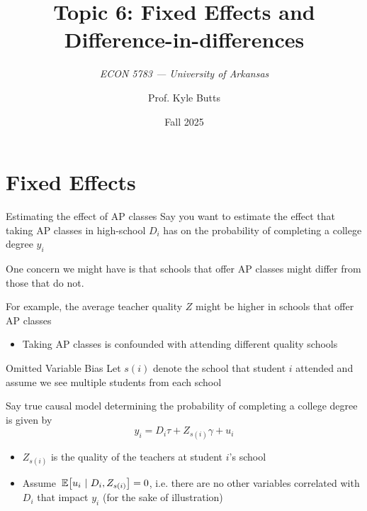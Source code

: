 \documentclass[aspectratio=169,t,11pt,table]{beamer}
\title{Topic 6: Fixed Effects and Difference-in-differences}
\subtitle{\it  ECON 5783 — University of Arkansas}
\date{Fall 2025}
\author{Prof. Kyle Butts}
\begin{document}
\begin{frame}
\maketitle

\end{frame}

\section{Fixed Effects}

\begin{frame}{Estimating the effect of AP classes}
  Say you want to estimate the effect that taking AP classes in high-school $D_i$ has on the probability of completing a college degree $y_i$
  
  \bigskip
  One concern we might have is that schools that offer AP classes might differ from those that do not. 
  
  \pause
  \bigskip
  For example, the average teacher quality $Z$ might be higher in schools that offer AP classes
  \begin{itemize}
    \item Taking AP classes is confounded with attending different quality schools
  \end{itemize}
\end{frame}

\begin{frame}{Omitted Variable Bias}
  Let $s(i)$ denote the school that student $i$ attended and assume we see multiple students from each school

  \pause
  \bigskip
  Say true causal model determining the probability of completing a college degree is given by
  $$
    y_i = D_i \tau + Z_{s(i)} \gamma + u_i
  $$
  
  \begin{itemize}
    \item $Z_{s(i)}$ is the quality of the teachers at student $i$'s school
    
    \item Assume $\expec{u_i}{D_i, Z_{s(i)}} = 0$, i.e. there are no other variables correlated with $D_i$ that impact $y_i$ (for the sake of illustration)
  \end{itemize}
\end{frame}
\end{document}

